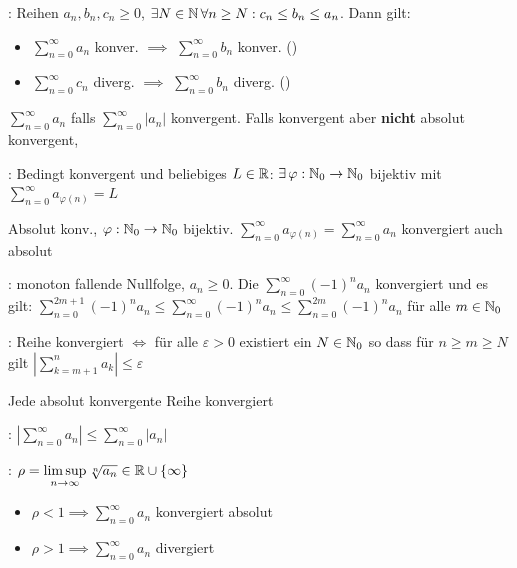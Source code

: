\Satz {}: Reihen $a_n, b_n, c_n\ge 0$,
$\exists N \in \mathbb{N} \, \forall n\ge N : c_n\le b_n\le a_n$. Dann gilt:
\vspace{-0.6em}
\begin{itemize}
    \item $\sum_{n=0}^{\infty} a_n$ konver. $\implies$ $\sum_{n=0}^{\infty} b_n$ konver. ()
    \item $\sum_{n=0}^{\infty} c_n$ diverg. $\implies$ $\sum_{n=0}^{\infty} b_n$ diverg. ()
\end{itemize}

\Def $\sum_{n=0}^{\infty} a_n$  falls $\sum_{n=0}^{\infty} |a_n|$ konvergent.
Falls konvergent aber \textbf{nicht} absolut konvergent, 

\Satz {}: Bedingt konvergent und beliebiges $L \in \mathbb{R}$:
$\exists \, \varphi: \mathbb{N}_0 \to \mathbb{N}_0$ bijektiv mit $\sum_{n=0}^{\infty} a_{\varphi(n)} = L$

\Satz {} Absolut konv., $\varphi: \mathbb{N}_0 \to \mathbb{N}_0$ bijektiv.
$\sum_{n=0}^{\infty} a_{\varphi(n)} = \sum_{n=0}^{\infty} a_n$ konvergiert auch absolut

\Satz {}: monoton fallende Nullfolge, $a_n \ge 0$.
Die  $\sum_{n=0}^{\infty} (-1)^n a_n$ konvergiert und es gilt:
$\sum_{n=0}^{2m+1} (-1)^n a_n\le \sum_{n=0}^{\infty} (-1)^n a_n\le \sum_{n=0}^{2m} (-1)^n a_n$ für alle $m \in \mathbb{N}_0$

\Satz {}: Reihe konvergiert $\iff$ für alle $\varepsilon > 0$ existiert ein $N \in \mathbb{N}_0$ so dass für $n\ge m\ge N$ gilt $|\sum_{k = m+1}^{n} a_k|\le \varepsilon$

\Satz Jede absolut konvergente Reihe konvergiert

\Satz {}: $\left|\sum\limits_{n=0}^{\infty} a_n \right|\le \sum\limits_{n=0}^{\infty}|a_n|$

\Satz {}: $\rho = \limsup\limits_{n\to\infty} \sqrt[n]{a_n} \in \mathbb{R} \cup \{\infty\}$
\vspace{-0.6em}
\begin{itemize}
    \item $\rho < 1 \implies \sum_{n=0}^{\infty} a_n$ konvergiert absolut
    \item $\rho > 1 \implies \sum_{n=0}^{\infty} a_n$ divergiert
\end{itemize}

